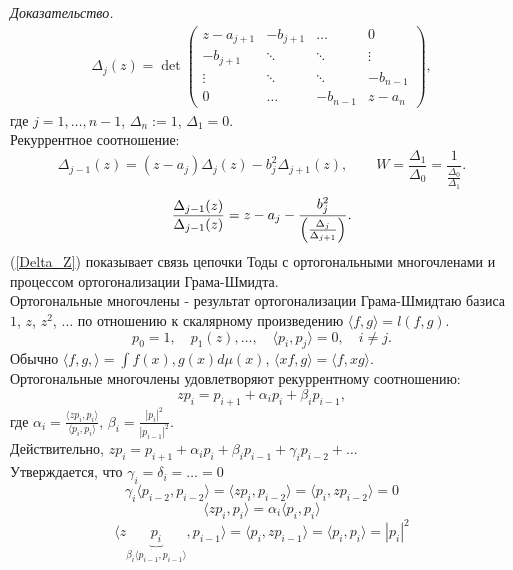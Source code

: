 \documentclass[a4paper,12pt]{article}
\theoremstyle{definition}
\theoremstyle{definition}
\theoremstyle{definition}
\newcommand{\bear}[1]{\begin{eqnarray}\label{#1}}
\newcommand{\ear}{\end{eqnarray}}
\begin{document}
\textit{Доказательство.}\\

\bear{Delta_Z}
\Delta_{j}(z) = \det{\left(\begin{array}{cccc}
z - a_{j+1}& -b_{j+1} &\ldots & 0\\
-b_{j+1}& \ddots &\ddots & \vdots\\
\vdots & \ddots &\ddots & -b_{n-1}\\
0& \ldots & -b_{n-1}  & z - a_{n}
\end{array} 
\right),}
\ear
где $j=1,\ldots, n-1$, $\Delta_{n}:=1$, $\Delta_{1} = 0$.\\

Рекуррентное соотношение:
\[\Delta_{j-1}(z) = (z-a_{j})\Delta_{j}(z) - b^{2}_{j}\Delta_{j+1}(z), \qquad W=\frac{\Delta_{1}}{\Delta_{0}} = \frac{1}{\frac{\Delta_{0}}{\Delta_{1}}}.\]
\[\displaystyle\frac{\Delta_{j-1}(z)}{\Delta_{j-1}(z)} = z - a_{j} - \displaystyle\frac{b^{2}_{j}}{\Bigl(\frac{\Delta_{j}}{\Delta_{j+1}}\Bigr)}.\]
(\ref{Delta_Z}) показывает связь цепочки Тоды с ортогональными многочленами и процессом  ортогонализации Грама-Шмидта.\\
Ортогональные многочлены - результат ортогонализации Грама-Шмидтаю базиса $1$, $z$, $z^{2}$, $\ldots$  по отношению к скалярному произведению
$\langle f,g \rangle = l(f,g)$.\\
\[p_{0} = 1, \quad p_{1}(z), \ldots, \quad \langle p_{i},p_{j}\rangle = 0, \quad i\neq j.\]
Обычно $\langle f,g,\rangle = \int {f(x),g(x)}d\mu(x)$, $\langle x f,g \rangle = \langle f,x g \rangle$.\\
Ортогональные многочлены удовлетворяют рекуррентному соотношению: 
\[zp_{i} = p_{i+1} + \alpha_{i}p_{i} + \beta_{i}p_{i-1},\]
где $\alpha_{i} = \displaystyle\frac{\langle z p_{i}, p_{i}\rangle}{\langle p_{i}, p_{i} \rangle}$, $\beta_{i} = \displaystyle\frac{|p_{i}|^{2}}{|p_{i-1}|^{2}}$.\\

Действительно, $zp_{i} = p_{i+1} + \alpha_{i}p_{i} + \beta_{i}p_{i-1} + \gamma_{i}p_{i-2} + \ldots$\\

Утверждается, что $\gamma_{i} = \delta_{i} = \ldots = 0$\\
\[\gamma_{i} \langle p_{i-2}, p_{i-2}\rangle = \langle z p_{i}, p_{i-2}\rangle = \langle p_{i}, z p_{i-2}\rangle =0\]
\[\langle z p_{i}, p_{i}\rangle = \alpha_{i}\langle p_{i},p_{i}\rangle\]
\[\langle z \underbrace{p_{i}}_{\beta_{i}\langle p_{i-1},p_{i-1}\rangle},p_{i-1}\rangle = \langle p_{i}, zp_{i-1}\rangle = \langle p_{i},p_{i}\rangle   = |p_{i}|^{2}\]
\end{document}
